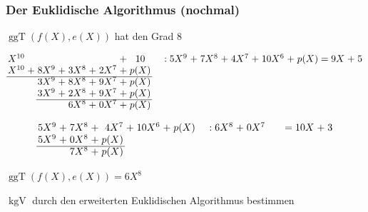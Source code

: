 \documentclass[11pt,aspectratio=169]{beamer}
\begin{document}
	\begin{frame}
		\frametitle{Der Euklidische Algorithmus (nochmal)}
		
		$\operatorname{ggT}(f(X),e(X))$ hat den Grad 8
		
		\[
		\arraycolsep=1.4pt
		\begin{array}{rcrcrcrcccrcrcrcrcrcrcrcrcr}
			X^{10}& & & & & & &+& 10& & & & &:&5X^9&+&7X^8&+& 4X^7&+&10X^6&+&p(X)&=&9X&+&5\\
			X^{10}&+& 8X^9&+& 3X^8&+&2X^7&+& p(X)& &  & & & &   & & & & & &   & &  & & \\ \cline{1-9}
			&& 3X^9&+& 8X^8&+& 9X^7&+& p(X)& &   & & & & & &   & &  & & \\
			&& 3X^9&+& 2X^8&+& 9X^7&+& p(X)& &   & & & & & &   & &  & & \\ \cline{3-9}
			& &    & &6X^8&+&0X^7&+&p(X)& &   & & & & & &   & &  & & \\
		\end{array}
		\]
		
		\[
		\arraycolsep=1.4pt
		\begin{array}{rcrcrcrcccrcrcrcrcrcrcrcrcr}
			5X^9&+& 7X^8&+& 4X^7&+& 10X^6&+& p(X)& & & & &:&6X^8&+&0X^7& & & & & & &=&10X&+&3\\
			5X^9&+& 0X^8&+& p(X)& & & & & &  & & & &   & & & & & &   & &  & & \\ \cline{1-5}
			&& 7X^8&+& p(X)& & & & & &   & & & & & &   & &  & & \\
		\end{array}
		\]
		
		\vspace{10pt}
		
		$\operatorname{ggT}(f(X),e(X)) = 6X^8$
		
		\vspace{10pt}
		
		$\operatorname{kgV}$ durch den erweiterten Euklidischen Algorithmus bestimmen	
		
	\end{frame}
		
\end{document}
